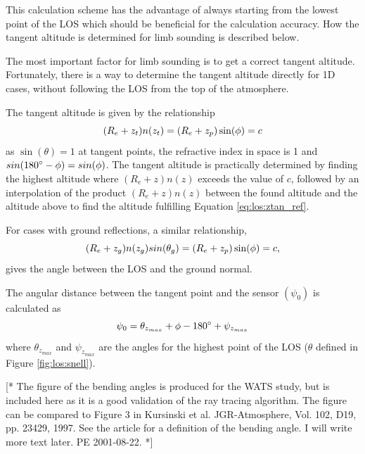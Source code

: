   This calculation scheme has the advantage of always starting from the 
  lowest point of the LOS which should be beneficial for the calculation
  accuracy. How the tangent altitude is determined for limb sounding is 
  described below. 
  

    
  The most important factor for limb sounding is to get a correct
  tangent altitude. Fortunately, there is a way to determine the
  tangent altitude directly for 1D cases, without following the LOS
  from the top of the atmosphere.

  The tangent altitude is given by the relationship
  \begin{equation}
    (R_e+z_t)n(z_t) = (R_e+z_p)\sin(\phi) = c
   \label{eq:los:ztan_ref}
  \end{equation}
  as $\sin(\theta)=1$ at tangent points, the refractive index in space
  is 1 and $sin(180^{\circ}-\phi)=sin(\phi)$. The tangent altitude
  is practically determined by finding the highest altitude where
  $(R_e+z)n(z)$ exceeds the value of $c$, followed by an interpolation
  of the product $(R_e+z)n(z)$ between the found altitude and the
  altitude above to find the altitude fulfilling Equation
  \ref{eq:los:ztan_ref}.
 
  For cases with ground reflections, a similar relationship,
  \begin{equation}
    (R_e+z_g)n(z_g)sin(\theta_g) = (R_e+z_p)\sin(\phi) = c,
  \end{equation}
  gives the angle between the LOS and the ground normal.

  The angular distance between the tangent point and the sensor $(\psi_0)$
  is calculated as
  \begin{equation}
    \psi_0 = \theta_{z_{max}} + \phi  - 180^\circ + \psi_{z_{max}}
  \end{equation}
  where $\theta_{z_{max}}$ and $\psi_{z_{max}}$ are the angles for the
  highest point of the LOS ($\theta$ defined in Figure \ref{fig:los:snell}).

  [* The figure of the bending angles is produced for the WATS study, but
  is included here as it is a good validation of the ray tracing algorithm.
  The figure can be compared to Figure 3 in Kursinski et al. JGR-Atmosphere,
  Vol. 102, D19, pp. 23429, 1997. See the article for a definition of the
  bending angle. 
  I will write more text later. PE 2001-08-22. *]


